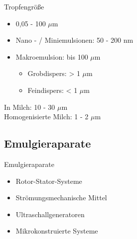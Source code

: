 \documentclass{beamer} %
\begin{document}
\begin{frame}{Tropfengröße}
	\begin{block}{}
		\begin{itemize}
			\item 0,05 - 100 $ \mu $m
			\item Nano - / Miniemulsionen: 50 - 200 nm
			\item Makroemulsion: bis 100 $ \mu $m
			\begin{itemize}
				\item Grobdispers: > 1 $ \mu $m
				\item Feindispers: < 1 $ \mu $m
			\end{itemize}
		\end{itemize}
	\end{block}
	\begin{exampleblock}{}
		In Milch: 10 - 30 $ \mu $m\\
		Homogenisierte Milch: 1 - 2 $ \mu $m
	\end{exampleblock}
\end{frame}

\subsection{Emulgieraparate}

\begin{frame}{Emulgieraparate}
	\begin{block}{}
		\begin{itemize}
			\item Rotor-Stator-Systeme \pause 
			\item Strömungsmechanische Mittel \pause
			\item Ultraschallgeneratoren \pause
			\item Mikrokonstruierte Systeme
		\end{itemize}
	\end{block}
\end{frame}
\end{document}
